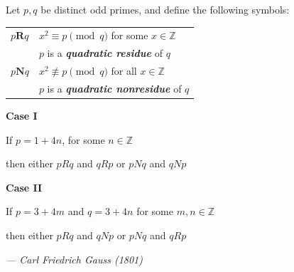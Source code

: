 \documentclass[17pt]{memoir}
\begin{document}

Let $p, q$ be distinct odd primes, and define the following symbols:

\medskip
\begin{table}[h]
\centering
  \begin{tabular}{l|l}
  $p\boldsymbol{R}q$ & $x^2 \equiv p\pmod q$ for some $x \in \mathbb{Z}$ \\
   &  $p$ is a \textbf{\textit{quadratic residue}} of $q$ \\
   \hline
  $p\boldsymbol{N}q$ & $x^2 \not\equiv p\pmod q$ for all $x \in \mathbb{Z}$ \\
   &  $p$ is a \textbf{\textit{quadratic nonresidue}} of $q$ \\
  \end{tabular}
\end{table}

\medskip
\textbf{Case I}

If $p = 1 + 4n$, for some $n \in \mathbb{Z}$

then either $pRq$ and $qRp$ or $pNq$ and $qNp$

\medskip
\textbf{Case II}

If $p = 3 + 4m$ and $q = 3 + 4n$ for some $m,n \in \mathbb{Z}$

then either $pRq$ and $qNp$ or $pNq$ and $qRp$

\bigskip
\begin{flushright}
  \textit{--- Carl Friedrich Gauss (1801)}
\end{flushright}

\newpage

\end{document}
